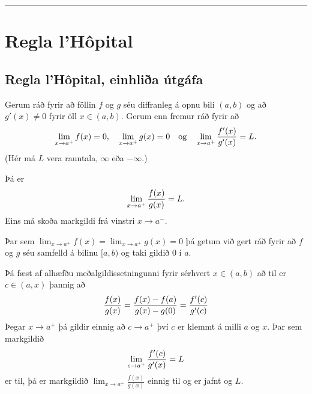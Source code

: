 \documentclass[b5paper,10pt,icelandic]{sphinxmanual}
\begin{document}

\bigskip\hrule{}\bigskip



\section{Regla l’Hôpital}
\label{kafli03:index-15}\label{kafli03:regla-lhopital}

\subsection{Regla l’Hôpital, einhliða útgáfa}
\label{kafli03:regla-lhopital-einhlia-utgafa}
Gerum ráð fyrir að föllin \(f\) og \(g\) séu diffranleg á opnu
bili \((a,
b)\) og að \(g'(x)\neq 0\) fyrir öll \(x\in (a, b)\). Gerum enn
fremur ráð fyrir að
\begin{gather}
\begin{split}\lim_{x\rightarrow a^+}f(x)=0, \quad \lim_{x\rightarrow a^+}g(x)=0
\quad\mbox{og}\quad \lim_{x\rightarrow a^+}\frac{f'(x)}{g'(x)}=L.\end{split}\notag
\end{gather}
(Hér má \(L\) vera rauntala, \(\infty\) eða \(-\infty\).)

Þá er
\begin{gather}
\begin{split}\lim_{x\rightarrow a^+}\frac{f(x)}{g(x)}=L.\end{split}\notag
\end{gather}
Eins má skoða markgildi frá vinstri \(x\to a^-\).

Þar sem \(\lim_{x\rightarrow a^+}f(x)=\lim_{x\rightarrow a^+}g(x)=0\)
þá getum við gert ráð fyrir að \(f\) og \(g\) séu samfelld á
bilinu \([a,b)\) og taki gildið 0 í \(a\).

Þá fæst af alhæfðu meðalgildissetningunni fyrir sérhvert \(x\in (a,b)\)
að til er \(c \in (a,x)\) þannig að
\begin{gather}
\begin{split}\frac{f(x)}{g(x)} = \frac{f(x)-f(a)}{g(x)-g(0)} = \frac{f'(c)}{g'(c)}\end{split}\notag
\end{gather}
Þegar \(x \to a^+\) þá gildir einnig að \(c \to a^+\) því
\(c\) er klemmt á milli \(a\) og \(x\).
Þar sem markgildið
\begin{gather}
\begin{split}\lim_{c\to a^+} \frac{f'(c)}{g'(x)} = L\end{split}\notag
\end{gather}
er til, þá er markgildið \(\lim_{x\rightarrow a^+}\frac{f(x)}{g(x)}\)
einnig til og er jafnt og \(L\).
\end{document}
